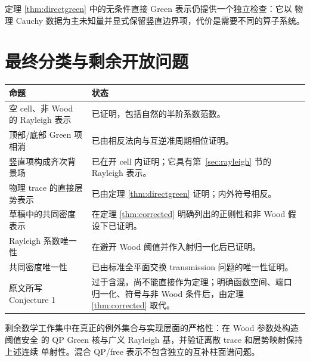 \documentclass[UTF8,11pt,fontset=fandol]{ctexart}
\theoremstyle{plain}
\theoremstyle{definition}
\theoremstyle{remark}
\begin{document}
定理 \ref{thm:directgreen} 中的无条件直接 Green 表示仍提供一个独立检查：它以
物理 Cauchy 数据为主未知量并显式保留竖直边界项，代价是需要不同的算子系统。

\section{最终分类与剩余开放问题}

\begin{center}
\begin{tabularx}{\textwidth}{p{}X}
\toprule
命题 & 状态 \\
\midrule
空 cell、非 Wood 的 Rayleigh 表示 & 已证明，包括自然的半阶系数范数。\\
顶部/底部 Green 项相消 & 已由相反法向与互逆准周期相位证明。\\
竖直项构成齐次背景场 & 已在开 cell 内证明；它具有第~\ref{sec:rayleigh} 节的
Rayleigh 表示。\\
物理 trace 的直接层势表示 & 已由定理 \ref{thm:directgreen} 证明；内外符号相反。\\
草稿中的共同密度表示 & 在定理 \ref{thm:corrected} 明确列出的正则性和非 Wood
假设下已证明。\\
Rayleigh 系数唯一性 & 在避开 Wood 阈值并作入射归一化后已证明。\\
共同密度唯一性 & 已由标准全平面交换 transmission 问题的唯一性证明。\\
原文所写 Conjecture 1 & 过于含混，尚不能直接作为定理；明确函数空间、端口
归一化、符号与非 Wood 条件后，由定理 \ref{thm:corrected} 取代。\\
\bottomrule
\end{tabularx}
\end{center}

剩余数学工作集中在真正的例外集合与实现层面的严格性：在 Wood 参数处构造阈值安全
的 QP Green 核与广义 Rayleigh 基，并验证离散 trace 和层势映射保持上述连续
单射性。混合 QP/free 表示不包含独立的互补柱面谱问题。
\end{document}
